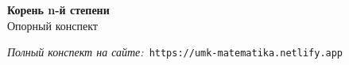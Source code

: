 \documentclass{umk-matematika}
\begin{document}
\begin{center}
{\Large\bfseries Корень n-й степени}
\\[0.3cm]{\large Опорный конспект}
\end{center}
\vspace{0.5cm}

\begin{center}
\textit{Полный конспект на сайте:}\
\texttt{https://umk-matematika.netlify.app}
\end{center}
\end{document}
